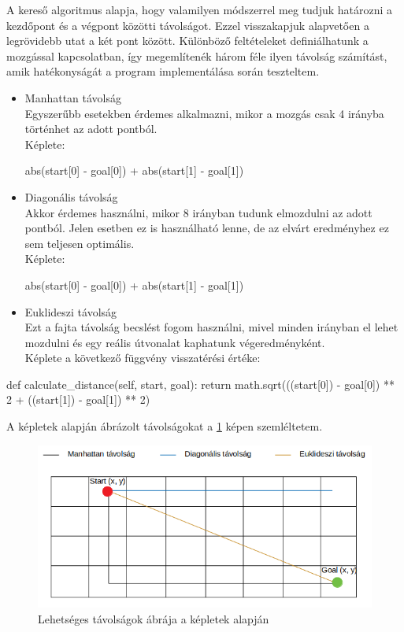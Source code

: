A kereső algoritmus alapja, hogy valamilyen módszerrel meg tudjuk határozni a kezdőpont és a végpont közötti távolságot. Ezzel visszakapjuk alapvetően a legrövidebb utat a két pont között. Különböző feltételeket definiálhatunk a mozgással kapcsolatban, így megemlítenék három féle ilyen távolság számítást, amik hatékonyságát a program implementálása során teszteltem.
\begin{itemize}
	\item Manhattan távolság\\
	Egyszerűbb esetekben érdemes alkalmazni, mikor a mozgás csak 4 irányba történhet az adott pontból. \\
	Képlete: 
	\begin{python}
	abs(start[0] - goal[0]) + abs(start[1] - goal[1])
	\end{python}
	\item Diagonális távolság\\
	Akkor érdemes használni, mikor 8 irányban tudunk elmozdulni az adott pontból. Jelen esetben ez is használható lenne, de az elvárt eredményhez ez sem teljesen optimális.\\
	Képlete:
	\begin{python}
	abs(start[0] - goal[0]) + abs(start[1] - goal[1])
	\end{python}
	\item Euklideszi távolság\\
	Ezt a fajta távolság becslést fogom használni, mivel minden irányban el lehet mozdulni és egy reális útvonalat kaphatunk végeredményként.\\
	Képlete a következő függvény visszatérési értéke:
\end{itemize}
\begin{python}
    def calculate_distance(self, start, goal):
        return math.sqrt(((start[0]) - goal[0]) ** 2 +
                         ((start[1]) - goal[1]) ** 2)
\end{python}

A képletek alapján ábrázolt távolságokat a  \ref{fig:distances} képen szemléltetem.

\begin{figure}[h!]
\centering
\includegraphics[scale=0.65]{images/distances.png}
\caption{Lehetséges távolságok ábrája a képletek alapján}
\label{fig:distances}
\end{figure}

